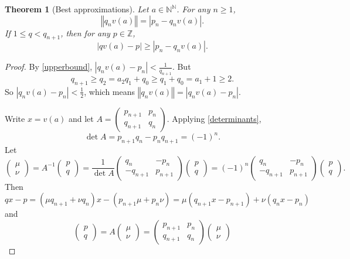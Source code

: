 \documentclass{article}
\newcommand{\norm}[1]{\left\Vert #1 \right\Vert}
\newtheorem{theorem}{Theorem}
\begin{document}
\begin{theorem}[Best approximations]
Let $a \in \mathbb{N}^{\mathbb{N}}$. For any $n \geq 1$,
\[
\norm{q_n v(a)} = |p_n-q_n v(a)|.
\]
If $1 \leq q < q_{n+1}$, then for any $p \in \mathbb{Z}$,
\[
|qv(a)-  p| \geq |p_n-q_n v(a)|.
\]
\label{bestapproximation}
\end{theorem}
\begin{proof}
By \eqref{upperbound}, $|q_n v(a) - p_n| < \frac{1}{q_{n+1}}$. 
But
\[
q_{n+1} \geq q_2 = a_2q_1+q_0 \geq q_1 + q_0 = a_1 + 1 \geq 2.
\]
So $|q_n v(a) - p_n| < \frac{1}{2}$, which means 
$\norm{q_n v(a)} = |q_n v(a) - p_n|$.  

Write $x=v(a)$ and
let $A = \begin{pmatrix} p_{n+1}&p_n\\ q_{n+1}&q_n \end{pmatrix}$. Applying
\eqref{determinants},
\[
\det A = p_{n+1}q_n - p_n q_{n+1} = (-1)^n. 
\] 
Let 
\[
\begin{pmatrix}\mu \\ \nu \end{pmatrix} = A^{-1} \begin{pmatrix} p\\ q \end{pmatrix}
=\frac{1}{\det A} \begin{pmatrix} q_n&-p_n\\ -q_{n+1}&p_{n+1} \end{pmatrix}  \begin{pmatrix} p\\ q \end{pmatrix}
=(-1)^n  \begin{pmatrix} q_n&-p_n\\ -q_{n+1}&p_{n+1} \end{pmatrix}  \begin{pmatrix} p\\ q \end{pmatrix}.
\]
Then
\[
q x - p = (\mu q_{n+1} + \nu q_n)x - (p_{n+1} \mu + p_n \nu)
=\mu (q_{n+1} x - p_{n+1}) + \nu(q_n x - p_n)
\]
and
\[
\begin{pmatrix}p\\ q\end{pmatrix}
=A \begin{pmatrix}\mu\\ \nu\end{pmatrix}
= \begin{pmatrix} p_{n+1}&p_n\\ q_{n+1}&q_n \end{pmatrix}\begin{pmatrix}\mu\\ \nu\end{pmatrix}
\]
\end{proof}
\end{document}
